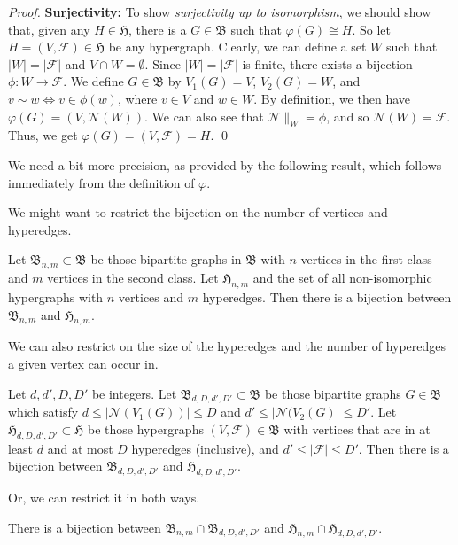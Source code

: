 \begin{proof}
\textbf{Surjectivity:}
To show \emph{surjectivity up to isomorphism}, we should show that, given any $H \in \mathfrak{H}$, there is a $G \in \mathfrak{B}$ such that $\varphi(G) \cong H$.
So let $H = (V, \mathcal{F}) \in \mathfrak{H}$ be any hypergraph.
Clearly, we can define a set $W$ such that $| W | = | \mathcal{F} |$ and $V \cap W = \emptyset$.
Since $| W | = | \mathcal{F} |$ is finite, there exists a bijection $\phi: W \rightarrow \mathcal{F}$.
We define $G \in \mathfrak{B}$ by $V_1(G) = V$, $V_2(G) = W$, and $v \sim w \Leftrightarrow v \in \phi(w)$, where $v \in V$ and $w \in W$.
By definition, we then have $\varphi(G) = (V, \mathcal{N}(W))$.
We can also see that $\mathcal{N} \|_{W} = \phi$, and so $\mathcal{N}(W) = \mathcal{F}$.
Thus, we get $\varphi(G) = (V, \mathcal{F}) = H$.
\qed
\end{proof}

We need a bit more precision, as provided by the following result, which follows immediately from the definition of $\varphi$.

We might want to restrict the bijection on the number of vertices and hyperedges.

\begin{corollary}
Let $\mathfrak{B}_{n,m} \subset \mathfrak{B}$ be those bipartite graphs in $\mathfrak{B}$ with $n$ vertices in the first class and $m$ vertices in the second class.
Let $\mathfrak{H}_{n,m}$ and the set of all non-isomorphic hypergraphs with $n$ vertices and $m$ hyperedges.
Then there is a bijection between $\mathfrak{B}_{n,m}$ and $\mathfrak{H}_{n,m}$.
\end{corollary}

We can also restrict on the size of the hyperedges and the number of hyperedges a given vertex can occur in.

\begin{corollary}
Let $d,d',D,D'$ be integers.
Let $\mathfrak{B}_{d,D,d',D'} \subset \mathfrak{B}$ be those bipartite graphs $G \in \mathfrak{B}$ which satisfy $d \leq | \mathcal{N}(V_1(G)) | \leq D$ and $d' \leq | \mathcal{N}(V_2(G) | \leq D'$.
Let $\mathfrak{H}_{d,D,d',D'} \subset \mathfrak{H}$ be those hypergraphs $(V, \mathcal{F}) \in \mathfrak{B}$ with vertices that are in at least $d$ and at most $D$ hyperedges (inclusive), and $d' \leq | \mathcal{F} | \leq D'$.
Then there is a bijection between $\mathfrak{B}_{d,D,d',D'}$ and $\mathfrak{H}_{d,D,d',D'}$.
\end{corollary}

Or, we can restrict it in both ways.

\begin{corollary}
\label{cor:hypergraph_bipartite_bijection}
There is a bijection between $\mathfrak{B}_{n,m} \cap \mathfrak{B}_{d,D,d',D'}$ and $\mathfrak{H}_{n,m} \cap \mathfrak{H}_{d,D,d',D'}$.
\end{corollary}
